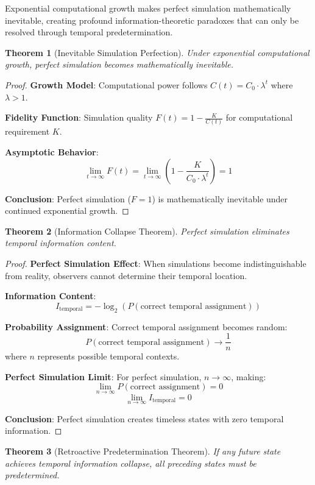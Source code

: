 \documentclass[12pt,a4paper]{article}
\newtheorem{theorem}{Theorem}[section]
\begin{document}
Exponential computational growth makes perfect simulation mathematically inevitable, creating profound information-theoretic paradoxes that can only be resolved through temporal predetermination.

\begin{theorem}[Inevitable Simulation Perfection]
Under exponential computational growth, perfect simulation becomes mathematically inevitable.
\end{theorem}

\begin{proof}
\textbf{Growth Model}: Computational power follows $C(t) = C_0 \cdot \lambda^t$ where $\lambda > 1$.

\textbf{Fidelity Function}: Simulation quality $F(t) = 1 - \frac{K}{C(t)}$ for computational requirement $K$.

\textbf{Asymptotic Behavior}:
$$\lim_{t \to \infty} F(t) = \lim_{t \to \infty} \left(1 - \frac{K}{C_0 \cdot \lambda^t}\right) = 1$$

\textbf{Conclusion}: Perfect simulation ($F = 1$) is mathematically inevitable under continued exponential growth.
\end{proof}

\begin{theorem}[Information Collapse Theorem]
Perfect simulation eliminates temporal information content.
\end{theorem}

\begin{proof}
\textbf{Perfect Simulation Effect}: When simulations become indistinguishable from reality, observers cannot determine their temporal location.

\textbf{Information Content}:
$$I_{\text{temporal}} = -\log_2(P(\text{correct temporal assignment}))$$

\textbf{Probability Assignment}: Correct temporal assignment becomes random:
$$P(\text{correct temporal assignment}) \to \frac{1}{n}$$
where $n$ represents possible temporal contexts.

\textbf{Perfect Simulation Limit}: For perfect simulation, $n \to \infty$, making:
$$\lim_{n \to \infty} P(\text{correct assignment}) = 0$$
$$\lim_{n \to \infty} I_{\text{temporal}} = 0$$

\textbf{Conclusion}: Perfect simulation creates timeless states with zero temporal information.
\end{proof}

\begin{theorem}[Retroactive Predetermination Theorem]
If any future state achieves temporal information collapse, all preceding states must be predetermined.
\end{theorem}
\end{document}
